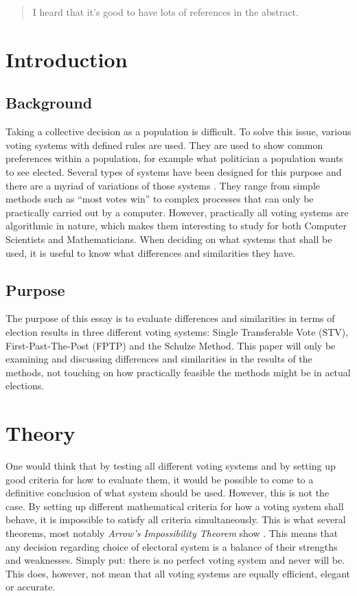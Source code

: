 \documentclass[12pt]{article}
\begin{document}


\pagebreak




\begin{abstract}
	I heard that it's good to have lots of references in the abstract.
\end{abstract}

\pagebreak

\tableofcontents

\pagebreak

\section{Introduction}
\subsection{Background}
Taking a collective decision as a population is difficult. To solve this issue, various voting systems with defined rules are used. They are used to show common preferences within a population, for example what politician a population wants to see elected. Several types of systems have been designed for this purpose and there are a myriad of variations of those systems \autocite{fairvoteND}. They range from simple methods such as “most votes win” to complex processes that can only be practically carried out by a computer. However, practically all voting systems are algorithmic in nature, which makes them interesting to study for both Computer Scientists and Mathematicians. When deciding on what systems that shall be used, it is useful to know what differences and similarities they have.
\subsection{Purpose}
The purpose of this essay is to evaluate differences and similarities in terms of election results in three different voting systems: Single Transferable Vote (STV), First-Past-The-Post (FPTP) and the Schulze Method. This paper will only be examining and discussing differences and similarities in the results of the methods, not touching on how practically feasible the methods might be in actual elections.
\pagebreak
\section{Theory}
One would think that by testing all different voting systems and by setting up good criteria for how to evaluate them, it would be possible to come to a definitive conclusion of what system should be used. However, this is not the case. By setting up different mathematical criteria for how a voting system shall behave, it is impossible to satisfy all criteria simultaneously. This is what several theorems, most notably \textit{Arrow's Impossibility Theorem} show \autocite{arrow1950difficulty}. This means that any decision regarding choice of electoral system is a balance of their strengths and weaknesses. Simply put: there is no perfect voting system and never will be. This does, however, not mean that all voting systems are equally efficient, elegant or accurate.
\end{document}
